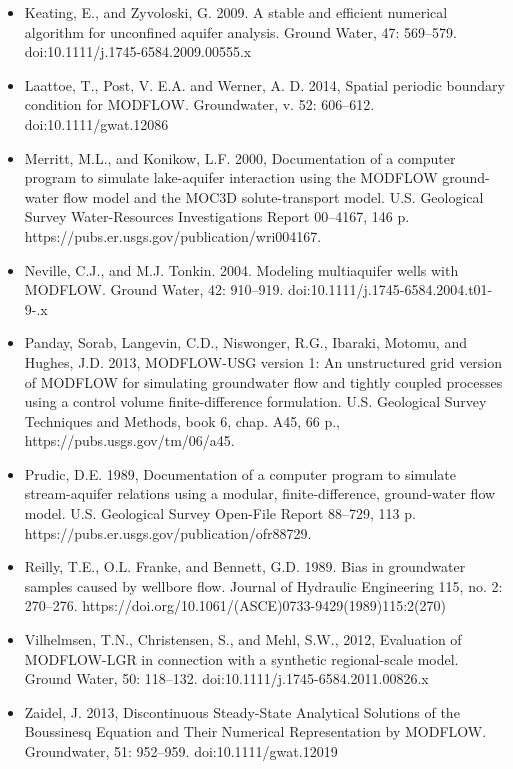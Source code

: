 \documentclass[11pt,twoside,twocolumn]{usgsreport}
\begin{document}
\begin{itemize}
\item Keating, E., and Zyvoloski, G. 2009. A stable and efficient numerical algorithm for unconfined aquifer analysis. Ground Water, 47: 569--579. doi:10.1111/j.1745-6584.2009.00555.x

\item Laattoe, T., Post, V. E.A. and Werner, A. D. 2014, Spatial periodic boundary condition for MODFLOW. Groundwater, v. 52: 606--612. doi:10.1111/gwat.12086

\item Merritt, M.L., and Konikow, L.F. 2000, Documentation of a computer program to simulate lake-aquifer interaction using the MODFLOW ground-water flow model and the MOC3D solute-transport model. U.S. Geological Survey Water-Resources Investigations Report 00--4167, 146 p. https://pubs.er.usgs.gov/publication/wri004167.

\item Neville, C.J., and M.J. Tonkin. 2004. Modeling multiaquifer wells with MODFLOW.  Ground Water, 42: 910--919. doi:10.1111/j.1745-6584.2004.t01-9-.x

\item Panday, Sorab, Langevin, C.D., Niswonger, R.G., Ibaraki, Motomu, and Hughes, J.D. 2013, MODFLOW-USG version 1: An unstructured grid version of MODFLOW for simulating groundwater flow and tightly coupled processes using a control volume finite-difference formulation. U.S. Geological Survey Techniques and Methods, book 6, chap. A45, 66 p., https://pubs.usgs.gov/tm/06/a45.

\item Prudic, D.E. 1989, Documentation of a computer program to simulate stream-aquifer relations using a modular, finite-difference, ground-water flow model. U.S. Geological Survey Open-File Report 88--729, 113 p. https://pubs.er.usgs.gov/publication/ofr88729.

\item Reilly, T.E., O.L. Franke, and Bennett, G.D. 1989. Bias in groundwater samples caused by wellbore flow. Journal of Hydraulic Engineering 115, no. 2: 270--276. https://doi.org/10.1061/(ASCE)0733-9429(1989)115:2(270)

\item Vilhelmsen, T.N., Christensen, S., and Mehl, S.W., 2012, Evaluation of MODFLOW-LGR in connection with a synthetic regional-scale model. Ground Water, 50: 118--132. doi:10.1111/j.1745-6584.2011.00826.x

\item Zaidel, J. 2013, Discontinuous Steady-State Analytical Solutions of the Boussinesq Equation and Their Numerical Representation by MODFLOW. Groundwater, 51: 952--959. doi:10.1111/gwat.12019
\end{itemize}


\justifying
\vspace*{\fill}
\clearpage
\pagestyle{backofreport}
\makebackcover
\end{document}
